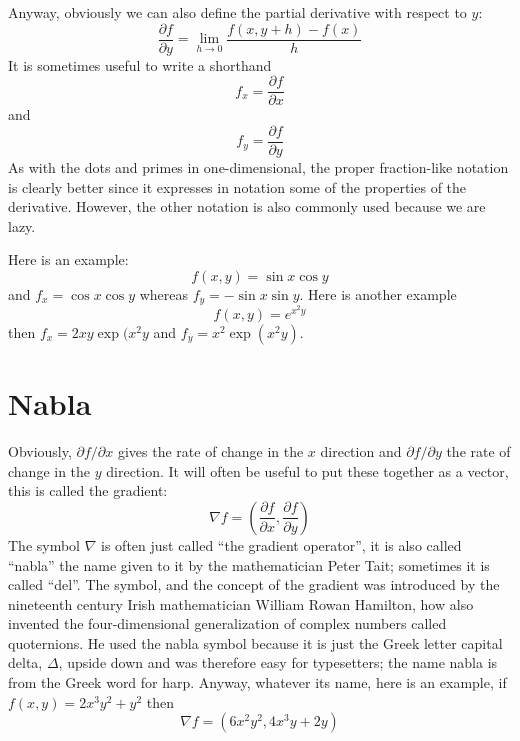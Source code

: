 \documentclass[12pt]{article}
\begin{document}
Anyway, obviously we can also define the partial derivative with respect to $y$:
\begin{equation}
  \frac{\partial f}{\partial y}=\lim_{h\rightarrow 0}\frac{f(x,y+h)-f(x)}{h}
\end{equation}
It is sometimes useful to write a shorthand
\begin{equation}
  f_x=\frac{\partial f}{\partial x}
\end{equation}
and
\begin{equation}
  f_y=\frac{\partial f}{\partial y}
\end{equation}
As with the dots and primes in one-dimensional, the proper
fraction-like notation is clearly better since it expresses in
notation some of the properties of the derivative. However, the other
notation is also commonly used because we are lazy.

Here is an example:
\begin{equation}
  f(x,y)=\sin{x}\cos{y}
\end{equation}
and $f_x=\cos{x}\cos{y}$ whereas $f_y=-\sin{x}\sin{y}$. Here is another example 
\begin{equation}
  f(x,y)=e^{x^2y}
\end{equation}
then $f_x=2xy\exp{(x^2y}$ and $f_y=x^2\exp{(x^2y)}$.

\section*{Nabla}

Obviously, $\partial f/\partial x$ gives the rate of change in the $x$
direction and $\partial f/\partial y$ the rate of change in the $y$
direction. It will often be useful to put these together as a vector, this is called the gradient:
\begin{equation}
  \nabla f=\left(\frac{\partial f}{\partial x},\frac{\partial f}{\partial y}\right)
\end{equation}
The symbol $\nabla$ is often just called ``the gradient operator'', it
is also called ``nabla'' the name given to it by the mathematician
Peter Tait; sometimes it is called ``del''. The symbol, and the
concept of the gradient was introduced by the nineteenth century Irish
mathematician William Rowan Hamilton, how also invented the
four-dimensional generalization of complex numbers called
quoternions. He used the nabla symbol because it is just the Greek
letter capital delta, $\Delta$, upside down and was therefore easy for
typesetters; the name nabla is from the Greek word for harp. Anyway,
whatever its name, here is an example, if $f(x,y)=2x^3y^2+y^2$ then
\begin{equation}
  \nabla f=(6x^2y^2,4x^3y+2y)
\end{equation}
\end{document}
